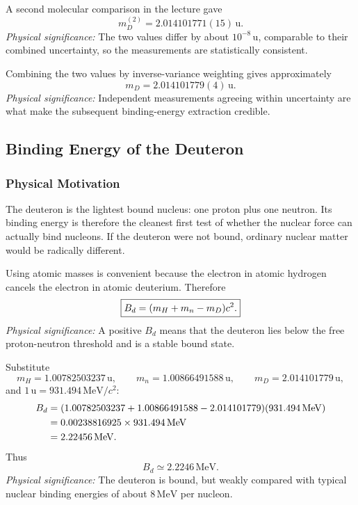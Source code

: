 A second molecular comparison in the lecture gave
\begin{equation}\label{eq:lec03:deuterium_mass_measurement_2}
  \boxed{
  m_D^{(2)}=2.014101771(15)\,\mathrm{u}.
  }
\end{equation}
\textit{Physical significance:} The two values differ by about $10^{-8}\,\mathrm{u}$, comparable to their combined uncertainty, so the measurements are statistically consistent.

Combining the two values by inverse-variance weighting gives approximately
\begin{equation}\label{eq:lec03:deuterium_mass_weighted}
  \boxed{
  m_D = 2.014101779(4)\,\mathrm{u}.
  }
\end{equation}
\textit{Physical significance:} Independent measurements agreeing within uncertainty are what make the subsequent binding-energy extraction credible.

\subsection*{Binding Energy of the Deuteron}

\subsubsection*{Physical Motivation}
The deuteron is the lightest bound nucleus: one proton plus one neutron.  Its binding energy is therefore the cleanest first test of whether the nuclear force can actually bind nucleons.  If the deuteron were not bound, ordinary nuclear matter would be radically different.

Using atomic masses is convenient because the electron in atomic hydrogen cancels the electron in atomic deuterium.  Therefore
\begin{equation}\label{eq:lec03:deuteron_binding_energy}
  \boxed{
  B_d=\qty(m_H+m_n-m_D)c^2.
  }
\end{equation}
\textit{Physical significance:} A positive $B_d$ means that the deuteron lies below the free proton-neutron threshold and is a stable bound state.

Substitute
\[
  m_H=1.00782503237\,\mathrm{u},\qquad
  m_n=1.00866491588\,\mathrm{u},\qquad
  m_D=2.014101779\,\mathrm{u},
\]
and $1\,\mathrm{u}=931.494\,\mathrm{MeV}/c^2$:
\begin{align*}
B_d
&=\qty(1.00782503237+1.00866491588-2.014101779)
  (931.494\,\mathrm{MeV})\\
&=0.00238816925\times 931.494\,\mathrm{MeV}\\
&=2.22456\,\mathrm{MeV}.
\end{align*}
Thus
\begin{equation}\label{eq:lec03:deuteron_binding_energy_value}
  \boxed{
  B_d \simeq 2.2246\,\mathrm{MeV}.
  }
\end{equation}
\textit{Physical significance:} The deuteron is bound, but weakly compared with typical nuclear binding energies of about $8\,\mathrm{MeV}$ per nucleon.


